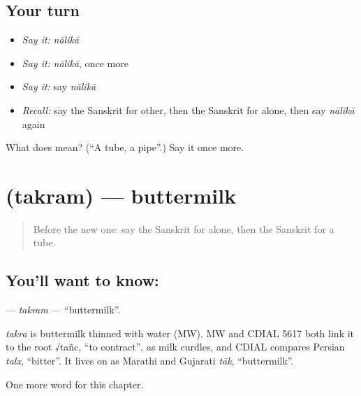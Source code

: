 \subsection*{Your turn}
\begin{itemize}
\raggedright
  \item \emph{Say it:} \emph{nālikā}
  \item \emph{Say it:} \emph{nālikā}, once more
  \item \emph{Say it:} say \emph{nālikā}
  \item \emph{Recall:} say the Sanskrit for other, then the Sanskrit for alone, then say \emph{nālikā} again
\end{itemize}

\begin{tcolorbox}[breakable,colback=teal!4,colframe=teal!35!black,title={Before you move on}]
What does  mean? (\textquotedblleft{}A tube, a pipe\textquotedblright{}.) Say it once more.
\end{tcolorbox}
\section[\texorpdfstring{\sk{तक्रम्} (takram)}{तक्रम् (takram)}]{ (takram) — buttermilk}

\label{lesson:SA-C245-takram}



\begin{quote}
Before the new one: say the Sanskrit for alone, then the Sanskrit for a tube.
\end{quote}

\subsection*{You'll want to know: }
\textbf{} — \emph{takram} — \textquotedblleft{}buttermilk\textquotedblright{}.

\begin{cousinweb}
\emph{takra} is buttermilk thinned with water (MW). MW and CDIAL 5617 both link it to the root √tañc, \textquotedblleft{}to contract\textquotedblright{}, as milk curdles, and CDIAL compares Persian \emph{talx}, \textquotedblleft{}bitter\textquotedblright{}. It lives on as Marathi and Gujarati \emph{tāk}, \textquotedblleft{}buttermilk\textquotedblright{}.
\end{cousinweb}

\begin{grammarlens}[title={What you've built}]
One more word for this chapter.
\end{grammarlens}

